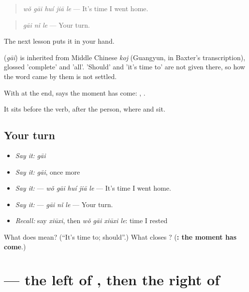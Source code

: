\begin{quote}
\textbf{} \emph{wǒ gāi huí jiā le} — It's time I went home.
\end{quote}

\begin{quote}
\textbf{} \emph{gāi nǐ le} — Your turn.
\end{quote}

The next lesson puts it in your hand.

\begin{cousinweb}
\textbf{} (\emph{gāi}) is inherited from Middle Chinese \emph{koj} (Guangyun, in Baxter's transcription), glossed 'complete' and 'all'. 'Should' and 'it's time to' are not given there, so how the word came by them is not settled.
\end{cousinweb}

\begin{grammarlens}[title={What you've built}]
With  at the end,  says the moment has come: , .

It sits before the verb, after the person, where  and  sit.
\end{grammarlens}

\subsection*{Your turn}
\begin{itemize}
\raggedright
  \item \emph{Say it:} \emph{gāi}
  \item \emph{Say it:} \emph{gāi}, once more
  \item \emph{Say it:}  — \emph{wǒ gāi huí jiā le} — It's time I went home.
  \item \emph{Say it:}  — \emph{gāi nǐ le} — Your turn.
  \item \emph{Recall:} say \emph{xiūxi}, then \emph{wǒ gāi xiūxi le}: time I rested
\end{itemize}

\begin{tcolorbox}[breakable,colback=teal!4,colframe=teal!35!black,title={Before you move on}]
What does  mean? (\textquotedblleft{}It's time to; should\textquotedblright{}.) What closes ? (\textbf{: the moment has come}.)
\end{tcolorbox}
\section[\texorpdfstring{\zh{该} (gāi)}{该 (gāi)}]{ — the left of , then the right of }

